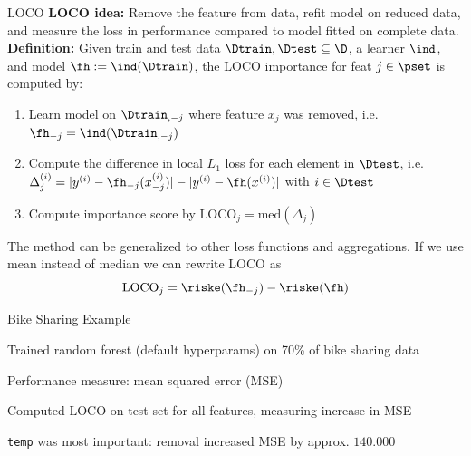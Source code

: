 \documentclass[10pt,compress,t,notes=noshow, xcolor=table]{beamer}
\begin{document}
	
	
	




\begin{framev}[align=top]{LOCO  }
%
\textbf{LOCO idea:} Remove the feature from data, refit model on reduced data, and measure the loss in performance compared to model fitted on complete data.\\
\pause
\spacer[0.25]
\textbf{Definition:} Given train and test data $\Dtrain, \Dtest \subseteq \D$, a learner $\ind$, and model $\fh := \ind(\Dtrain)$, the LOCO importance for feat $j \in \pset$ is computed by:\\
\spacer[0.25]
\begin{enumerate}
\item Learn model on ${\Dtrain}_{,-j}$ where feature $x_j$ was removed, i.e. $\fh_{-j} = \ind({\Dtrain}_{,-j})$
\pause
\item Compute the difference in local $L_1$ loss for each element in $\Dtest$, i.e. $\Delta_j^{(i)} = |y^{(i)} - \fh_{-j}(x_{-j}^{(i)})| - |y^{(i)} - \fh(x^{(i)})|$ with $i \in \Dtest$
\pause
\item Compute importance score by $\text{LOCO}_j = \text{med}(\Delta_j)$
\end{enumerate}
\spacer[0.25]
\pause
The method can be generalized to other loss functions and aggregations. If we use mean instead of median we can rewrite LOCO as
%
$$
\text{LOCO}_j = \riske(\fh_{-j}) - \riske(\fh)
$$
\end{framev}


\begin{framev}[align=top]{Bike Sharing Example}
%
%
\begin{itemizeS}
\item Trained random forest (default hyperparams) on 70\% of bike sharing data
\item Performance measure: mean squared error (MSE)
\item Computed LOCO on test set for all features, measuring increase in MSE
\item \texttt{temp} was most important: removal increased MSE by approx. $140.000$
\end{itemizeS}
\end{framev}
\end{document}
